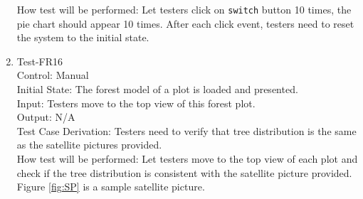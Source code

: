 \documentclass[12pt, titlepage]{article}
\begin{document}
\begin{enumerate}
How test will be performed: Let testers click on \verb|switch|
button 10 times, the pie chart should appear 10 times. After each 
click event, testers need to reset the system to the initial state.

\item{Test-FR16\\}
Control: Manual\\ 

Initial State: The forest model of a plot is loaded and presented.\\

Input: Testers move to the top view of this forest plot.\\

Output: N/A\\

Test Case Derivation: Testers need to verify that tree 
distribution is the same as the satellite pictures provided. \\
					
How test will be performed: Let testers move to the top view of each 
plot and check if the tree distribution is consistent with the 
satellite picture provided. Figure \ref{fig:SP} is a sample satellite picture.

\end{enumerate}
\end{document}
